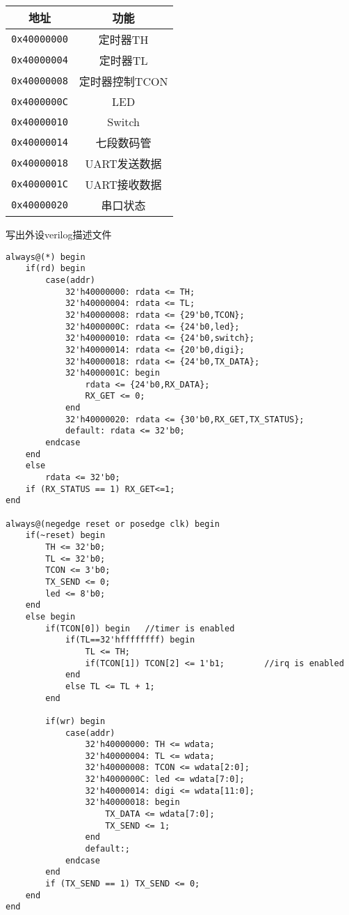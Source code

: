 \documentclass{ctexart}
\begin{document}
		\begin{table}[ht]
			\centering
			\begin{tabular}{|c|c|}
				\hline
				地址 & 功能  \\
				\hline
				\verb"0x40000000" & 定时器TH \\
				\verb"0x40000004" & 定时器TL \\
				\verb"0x40000008" & 定时器控制TCON \\
				\verb"0x4000000C" & LED \\
				\verb"0x40000010" & Switch \\
				\verb"0x40000014" & 七段数码管 \\
				\verb"0x40000018" & UART发送数据 \\
				\verb"0x4000001C" & UART接收数据 \\
				\verb"0x40000020" & 串口状态 \\ 
				\hline
			\end{tabular}
		\end{table}

		写出外设verilog描述文件

\begin{verbatim}
always@(*) begin
	if(rd) begin
		case(addr)
			32'h40000000: rdata <= TH;			
			32'h40000004: rdata <= TL;			
			32'h40000008: rdata <= {29'b0,TCON};				
			32'h4000000C: rdata <= {24'b0,led};			
			32'h40000010: rdata <= {24'b0,switch};
			32'h40000014: rdata <= {20'b0,digi};
			32'h40000018: rdata <= {24'b0,TX_DATA};
			32'h4000001C: begin
				rdata <= {24'b0,RX_DATA};	
				RX_GET <= 0;
			end
			32'h40000020: rdata <= {30'b0,RX_GET,TX_STATUS};
			default: rdata <= 32'b0;
		endcase
	end
	else
		rdata <= 32'b0;
	if (RX_STATUS == 1) RX_GET<=1;
end

always@(negedge reset or posedge clk) begin
	if(~reset) begin
		TH <= 32'b0;
		TL <= 32'b0;
		TCON <= 3'b0;	
		TX_SEND <= 0;
		led <= 8'b0;
	end
	else begin
		if(TCON[0]) begin	//timer is enabled
			if(TL==32'hffffffff) begin
				TL <= TH;
				if(TCON[1]) TCON[2] <= 1'b1;		//irq is enabled
			end
			else TL <= TL + 1;
		end
		
		if(wr) begin
			case(addr)
				32'h40000000: TH <= wdata;
				32'h40000004: TL <= wdata;
				32'h40000008: TCON <= wdata[2:0];		
				32'h4000000C: led <= wdata[7:0];			
				32'h40000014: digi <= wdata[11:0];
				32'h40000018: begin
					TX_DATA <= wdata[7:0];
					TX_SEND <= 1;
				end
				default:;
			endcase
		end
		if (TX_SEND == 1) TX_SEND <= 0;
	end
end				
\end{verbatim}
\end{document}
